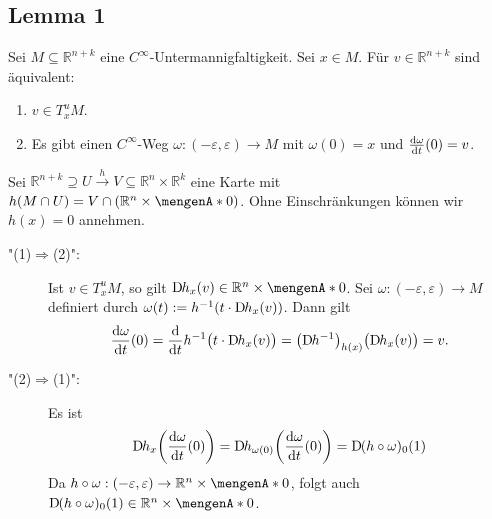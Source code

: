 \subsection[Lemma 1: Vektoren in $T^u_x M$ sind Geschwindigkeitsvektoren von Wegen durch $x$]{Lemma 1} %
\label{sub:184}
Sei $M \subseteq \mathds{R}^{n+k}$ eine $C^\infty$-Untermannigfaltigkeit. Sei $x \in M$. Für $v \in \mathds{R}^{n+k}$ sind äquivalent:
\begin{enumerate}[(1)]
	\item $v \in T^u_x M$.
	\item Es gibt einen $C^\infty$-Weg $\omega : (-\varepsilon, \varepsilon) \to M$ mit $\omega(0)=x$ und $\frac{\mathrm{d} \omega}{\mathrm{d} t} (0)=v$.
\end{enumerate}
Sei $\mathds{R}^{n+k} \supseteq U \xrightarrow{h} V \subseteq \mathds{R}^n \times \mathds{R}^k $ eine Karte mit $h(M \cap U) = V \cap (\mathds{R}^n \times \set{0})$.
Ohne Einschränkungen können wir $h(x)=0$ annehmen.
\begin{description}
	\item["(1)$\Rightarrow$(2)":] Ist $v \in T_x^u M$, so gilt $\D h_x (v) \in \mathds{R}^n \times \set{0}$. Sei $\omega : (-\varepsilon,\varepsilon) \to M$ definiert durch
	$\omega(t) := h ^{-1} \enbrace*{t \cdot \D h_x(v)}$. Dann gilt
	\begin{align*}
		\diffd{\omega}{t}(0) = \diffd{}{t} h ^{-1} \enbrace[\big]{t \cdot \D h_x(v)} = \enbrace*{\D h ^{-1}}_{h(x)} \enbrace[\big]{\D h_x (v)} = v.
	\end{align*}
	\item["(2)$\Rightarrow$(1)":] Es ist 
	\begin{align*}
		\D h_x \enbrace*{\diffd{\omega}{t}(0)} = \D h_{\omega(0)} \enbrace*{\diffd{\omega}{t}(0)} = \D(h \circ \omega)_0 (1) 
	\end{align*}
	Da $h \circ \omega : (-\varepsilon,\varepsilon) \to \mathds{R}^n \times \set{0}$, folgt auch $\D(h \circ \omega)_0 (1) \in \mathds{R}^n \times \set{0}$. \bewende
\end{description}

